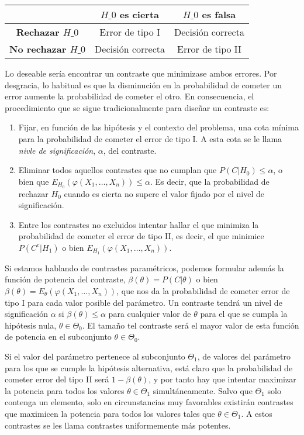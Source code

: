 \begin{tabular}{|c|c|c|}
\hline 
 & \textbf{$H\_0$ es cierta} & \textbf{$H\_0$ es falsa} \tabularnewline
\hline 
\hline 
\textbf{Rechazar $H\_0$} & Error de tipo I & Decisi\'on correcta\tabularnewline
\hline 
\textbf{No rechazar $H\_0$}  & Decisi\'on correcta & Error de tipo II\tabularnewline
\hline 
\end{tabular}

Lo deseable ser\'ia encontrar un contraste que minimizase ambos errores. Por desgracia, lo habitual es que la disminuci\'on en la probabilidad de cometer un error aumente la probabilidad de cometer el otro. En consecuencia, el procedimiento que se sigue tradicionalmente para dise\~nar un contraste es:
\begin{enumerate}
\item Fijar, en funci\'on de las hip\'otesis y el contexto del problema, una cota m\'inima para la probabilidad de cometer el error de tipo I. A esta cota se le llama \textit{nivle de significaci\'on}, $\alpha$, del contraste.
\item Eliminar todos aquellos contrastes que no cumplan que $P(C|H_0)\leq\alpha$, o bien que $E_{H_0}(\varphi(X_1,\ldots,X_n))\leq\alpha$. Es decir, que la probabilidad de rechazar $H_0$ cuando es cierta no supere el valor fijado por el nivel de significaci\'on.
\item Entre los contrastes no excluidos intentar hallar el que minimiza la probabilidad de cometer el error de tipo II, es decir, el que minimice $P(C^c|H_1)$ o bien $E_{H_1}(\varphi(X_1,\ldots,X_n))$.
\end{enumerate}


Si estamos hablando de contrastes param\'etricos, podemos formular adem\'as la funci\'on de potencia del contraste, $\beta(\theta)=P(C|\theta)$ o bien $\beta(\theta)=E_{\theta}(\varphi(X_1,\ldots,X_n))$, que nos da la probabilidad de cometer error de tipo I para cada valor posible del par\'ametro. Un contraste tendr\'a un nivel de significaci\'on $\alpha$ si $\beta(\theta)\leq\alpha$ para cualquier valor de $\theta$ para el que se cumpla la hip\'otesis nula, $\theta\in\Theta_0$. El tama\~no tel contraste ser\'a el mayor valor de esta funci\'on de potencia en el subconjunto $\theta\in\Theta_0$.

Si el valor del par\'ametro pertenece al subconjunto $\Theta_1$, de valores del par\'ametro para los que se cumple la hip\'otesis alternativa, est\'a claro que la probabilidad de cometer error del tipo II ser\'a $1-\beta(\theta)$, y por tanto hay que intentar maximizar la potencia para todos los valores $\theta\in\Theta_1$ simult\'aneamente. Salvo que $\Theta_1$ solo contenga un elemento, solo en circunstancias muy favorables existir\'an contrastes que maximicen la potencia para todos los valores tales que $\theta\in\Theta_1$. A estos contrastes se les llama contrastes uniformemente m\'as potentes.

